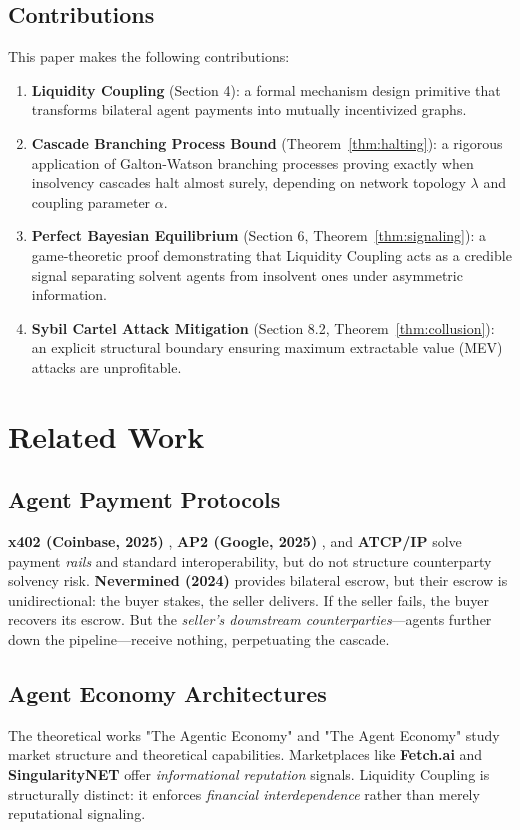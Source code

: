 \documentclass[11pt]{article}
\begin{document}
\subsection{Contributions}
This paper makes the following contributions:
\begin{enumerate}
    \item \textbf{Liquidity Coupling} (Section 4): a formal mechanism design primitive that transforms bilateral agent payments into mutually incentivized graphs.
    \item \textbf{Cascade Branching Process Bound} (Theorem~\ref{thm:halting}): a rigorous application of Galton-Watson branching processes proving exactly when insolvency cascades halt almost surely, depending on network topology $\lambda$ and coupling parameter $\alpha$.
    \item \textbf{Perfect Bayesian Equilibrium} (Section 6, Theorem~\ref{thm:signaling}): a game-theoretic proof demonstrating that Liquidity Coupling acts as a credible signal separating solvent agents from insolvent ones under asymmetric information.
    \item \textbf{Sybil Cartel Attack Mitigation} (Section 8.2, Theorem~\ref{thm:collusion}): an explicit structural boundary ensuring maximum extractable value (MEV) attacks are unprofitable.
\end{enumerate}

\section{Related Work}

\subsection{Agent Payment Protocols}
\textbf{x402 (Coinbase, 2025)} \cite{x402_2025}, \textbf{AP2 (Google, 2025)} \cite{ap2_2025}, and \textbf{ATCP/IP} \cite{atcp_2025} solve payment \textit{rails} and standard interoperability, but do not structure counterparty solvency risk. \textbf{Nevermined (2024)} \cite{nevermined_2024} provides bilateral escrow, but their escrow is unidirectional: the buyer stakes, the seller delivers. If the seller fails, the buyer recovers its escrow. But the \textit{seller's downstream counterparties}---agents further down the pipeline---receive nothing, perpetuating the cascade.

\subsection{Agent Economy Architectures}
The theoretical works "The Agentic Economy" \cite{agentic_economy_2025} and "The Agent Economy" \cite{agent_economy_2026} study market structure and theoretical capabilities. Marketplaces like \textbf{Fetch.ai} \cite{fetch_2019} and \textbf{SingularityNET} \cite{singularitynet_2017} offer \textit{informational reputation} signals. Liquidity Coupling is structurally distinct: it enforces \textit{financial interdependence} rather than merely reputational signaling.
\end{document}
